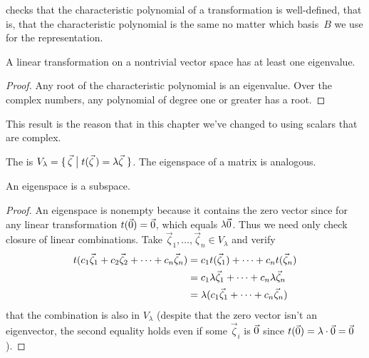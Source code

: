 \noindent {} checks that the 
characteristic polynomial of a transformation is 
well-defined, that is, that the characteristic polynomial is the same
no matter which basis~$B$ we use for the representation.

\begin{lemma} \label{le:MapNonTrivSpHasEigen}
A linear transformation on a nontrivial vector space has at least one
eigenvalue.
\end{lemma}

\begin{proof}
Any root of the characteristic polynomial is an eigenvalue.
Over the complex numbers, any polynomial of degree one or greater
has a root.
\end{proof}

\begin{remark}
This result is the reason that in this chapter 
we've changed to using scalars that are complex.
\end{remark}


\begin{definition}
The 
is
$
  V_\lambda=\mbox{$\{\,\vec{\zeta}\bigm| t(\vec{\zeta}\,)=\lambda\vec{\zeta}\,\,\}$}
$.
The eigenspace of a matrix is analogous.
\end{definition}


\begin{lemma}  \label{le:EigSpaceIsSubSp}
An eigenspace is a subspace.
\end{lemma}

\begin{proof}
An eigenspace is nonempty because it contains the zero
vector since for any linear transformation $t(\vec{0})=\vec{0}$, which equals
$\lambda\vec{0}$. 
Thus we need only check closure of linear combinations.
Take \( \vec{\zeta}_1,\ldots,\vec{\zeta}_n\in V_\lambda \) and verify 
\begin{align*}
  t(c_1\vec{\zeta}_1+c_2\vec{\zeta}_2+\cdots +c_n\vec{\zeta}_n)
  &=c_1t(\vec{\zeta}_1)+\dots+c_nt(\vec{\zeta}_n)               \\
  &=c_1\lambda\vec{\zeta}_1+\dots+c_n\lambda\vec{\zeta}_n          \\
  &=\lambda(c_1\vec{\zeta}_1+\dots+c_n\vec{\zeta}_n)
\end{align*}
that the combination is also in $V_\lambda$
(despite that the zero vector isn't an eigenvector, 
the second equality holds even if some \( \vec{\zeta}_i \) is \( \vec{0} \) since
\( t(\vec{0})=\lambda\cdot\vec{0}=\vec{0} \)).
\end{proof}


